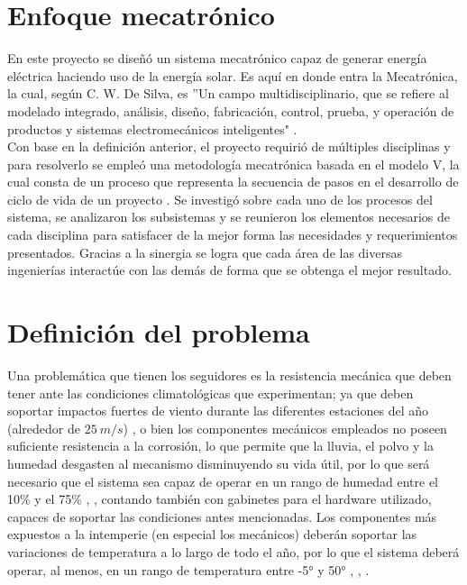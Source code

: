 \section{Enfoque mecatrónico}
En este proyecto se diseñó un sistema mecatrónico capaz de generar energía eléctrica haciendo uso de la energía solar. Es aquí en donde entra la Mecatrónica, la cual, según C. W. De Silva, es ''Un campo multidisciplinario, que se refiere al modelado integrado, análisis, diseño, fabricación, control, prueba, y operación de productos y sistemas electromecánicos inteligentes" \cite{I1}.\\

Con base en la definición anterior, el proyecto requirió de múltiples disciplinas y para resolverlo se empleó una metodología mecatrónica basada en el modelo V, la cual consta de un proceso que representa la secuencia de pasos en el desarrollo de ciclo de vida de un proyecto \cite{I2}. Se investigó sobre cada uno de los procesos del sistema, se analizaron los subsistemas y se reunieron los elementos necesarios de cada disciplina para satisfacer de la mejor forma las necesidades y requerimientos presentados. Gracias a la sinergia se logra que cada área de las diversas ingenierías interactúe con las demás de forma que se obtenga el mejor resultado.

\newpage
\section{Definición del problema}

Una problemática que tienen los seguidores es la resistencia mecánica que deben tener ante las condiciones climatológicas que experimentan; ya que deben soportar impactos fuertes de viento durante las diferentes estaciones del año (alrededor de $25\ m/s$) \cite{I5:2019:Online}, o bien los componentes mecánicos empleados no poseen suficiente resistencia a la corrosión, lo que permite que la lluvia, el polvo y la humedad desgasten al mecanismo disminuyendo su vida útil, por lo que será necesario que el sistema sea capaz de operar en un rango de humedad entre el 10\% y el 75\% \cite{I6:2019:Online}, \cite{I5:2019:Online}, contando también con gabinetes para el hardware utilizado, capaces de soportar las condiciones antes mencionadas. Los componentes más expuestos a la intemperie (en especial los mecánicos) deberán soportar las variaciones de temperatura a lo largo de todo el año, por lo que el sistema deberá operar, al menos, en un rango de temperatura entre -5° y 50° \cite{I7}, \cite{I8}, \cite{I9}. \\

